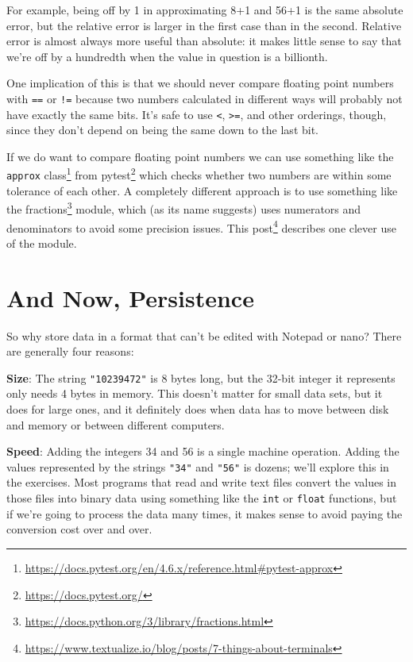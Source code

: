 \documentclass{scrbook}
\newcommand{\hreffoot}[2]{{#1}\footnote{\href{#2}{#2}}}
\begin{document}
For example,
being off by 1 in approximating 8+1 and 56+1 is the same absolute error,
but the relative error is larger in the first case than in the second.
Relative error is almost always more useful than absolute:
it makes little sense to say that we're off by a hundredth
when the value in question is a billionth.


One implication of this is that
we should never compare floating point numbers with \texttt{==} or \texttt{!=}
because two numbers calculated in different ways
will probably not have exactly the same bits.
It's safe to use \texttt{<}, \texttt{>=}, and other orderings,
though,
since they don't depend on being the same down to the last bit.


If we do want to compare floating point numbers
we can use something like \hreffoot{the \texttt{approx} class}{https://docs.pytest.org/en/4.6.x/reference.html\#pytest-approx} from \hreffoot{pytest}{https://docs.pytest.org/}
which checks whether two numbers are within some tolerance of each other.
A completely different approach is to use something like
the \hreffoot{fractions}{https://docs.python.org/3/library/fractions.html} module,
which (as its name suggests) uses numerators and denominators
to avoid some precision issues.
\hreffoot{This post}{https://www.textualize.io/blog/posts/7-things-about-terminals} describes one clever use of the module.

\section{And Now, Persistence}\label{binary-binary}


So why store data in a format that can't be edited with Notepad or nano?
There are generally four reasons:


\noindent \textbf{Size}: 
The string \texttt{"10239472"} is 8 bytes long,
but the 32-bit integer it represents only needs 4 bytes in memory.
This doesn't matter for small data sets,
but it does for large ones,
and it definitely does when data has to move between disk and memory
or between different computers.


\noindent \textbf{Speed}: 
Adding the integers 34 and 56 is a single machine operation.
Adding the values represented by the strings \texttt{"34"} and \texttt{"56"} is dozens;
we'll explore this in the exercises.
Most programs that read and write text files
convert the values in those files into binary data
using something like the \texttt{int} or \texttt{float} functions,
but if we're going to process the data many times,
it makes sense to avoid paying the conversion cost over and over.
\end{document}
